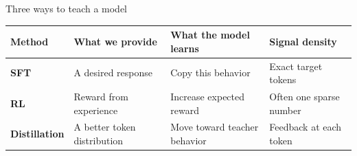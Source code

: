 \begin{frame}[t]{Three ways to teach a model}
  \vspace{3mm}
  \small
  \renewcommand{\arraystretch}{1.45}
  \begin{tabular}{L{0.16\textwidth}L{0.23\textwidth}L{0.25\textwidth}L{0.20\textwidth}}
    \toprule
    \textbf{Method} & \textbf{What we provide} & \textbf{What the model learns} & \textbf{Signal density} \\
    \midrule
    \textcolor{DeckBlue}{\textbf{SFT}} & A desired response & Copy this behavior & Exact target tokens \\
    \textcolor{DeckGold}{\textbf{RL}} & Reward from experience & Increase expected reward & Often one sparse number \\
    \textcolor{DeckTeal}{\textbf{Distillation}} & A better token distribution & Move toward teacher behavior & Feedback at each token \\
    \bottomrule
  \end{tabular}

\end{frame}
